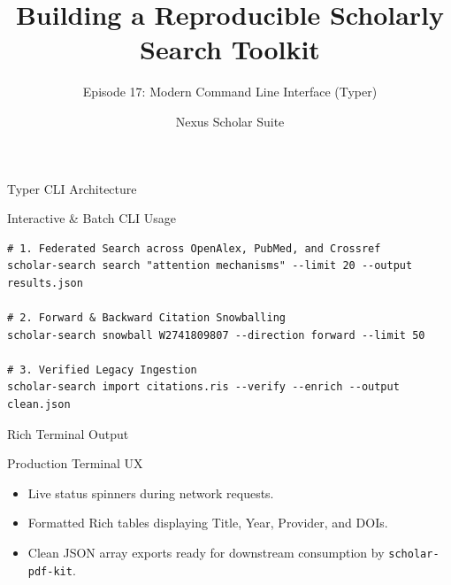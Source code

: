 \documentclass[aspectratio=169]{beamer}
\title{Building a Reproducible Scholarly Search Toolkit}
\subtitle{Episode 17: Modern Command Line Interface (Typer)}
\author{Nexus Scholar Suite}
\date{}
\begin{document}
\begin{frame}[plain]
  \titlepage
\end{frame}

\begin{frame}{Typer CLI Architecture}
  \begin{center}
  \end{center}
\end{frame}

\begin{frame}[fragile]{Interactive \& Batch CLI Usage}
\begin{lstlisting}[style=nexuspython]
# 1. Federated Search across OpenAlex, PubMed, and Crossref
scholar-search search "attention mechanisms" --limit 20 --output results.json

# 2. Forward & Backward Citation Snowballing
scholar-search snowball W2741809807 --direction forward --limit 50

# 3. Verified Legacy Ingestion
scholar-search import citations.ris --verify --enrich --output clean.json
\end{lstlisting}
\end{frame}

\begin{frame}{Rich Terminal Output}
  \begin{block}{Production Terminal UX}
    \begin{itemize}
      \item Live status spinners during network requests.
      \item Formatted Rich tables displaying Title, Year, Provider, and DOIs.
      \item Clean JSON array exports ready for downstream consumption by \texttt{scholar-pdf-kit}.
    \end{itemize}
  \end{block}
\end{frame}
\end{document}
